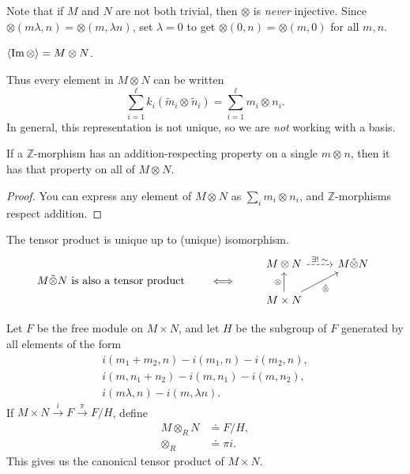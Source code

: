 \documentclass[twoside,10pt]{report}
\begin{document}
Note that if $M$ and $N$ are not both trivial, then $\otimes$ is \textit{never} injective. Since $\otimes(m \lambda,n) = \otimes(m,\lambda n)$, set $\lambda=0$ to get $\otimes(0,n)=\otimes(m,0)$ for all $m,n$.

\begin{prop}
$\langle \operatorname{Im} \otimes \rangle=M \otimes N$.
\end{prop}
Thus every element in $M \otimes_{}N$ can be written
\[
	\sum_{i=1}^{\ell} k_i (\tilde{m}_{i}\otimes_{}\tilde{n}_{i}) = \sum_{i=1}^{\ell} m_i \otimes_{}n_i.
\] 
In general, this representation is not unique, so we are \textit{not} working with a basis.

\begin{lem}
If a $\mathbb{Z}$-morphism has an addition-respecting property on a single $m \otimes_{}n$, then it has that property on all of $M \otimes_{}N$.
\end{lem}
\begin{proof}
	You can express any element of $M \otimes_{}N$ as $\sum_i m_i \otimes_{}n_i$, and $\mathbb{Z}$-morphisms respect addition.
\end{proof}

\begin{thrm}[Uniqueness]
	The tensor product is unique up to (unique) isomorphism.
	\begin{equation*}
        \begin{aligned}[c]
		M \tilde{\otimes} N \text{ is also a tensor product}
        \end{aligned}
        \qquad\iff\qquad
        \begin{aligned}[c]
		\begin{tikzcd}
			M \otimes N \rar[dashed]{\exists!\;\sim} & M \tilde{\otimes} N \\
			M\times N \uar{\otimes}\arrow[ur,"\tilde{\otimes}"']
		\end{tikzcd}
        \end{aligned}
	\end{equation*}
\end{thrm}

Let $F$ be the free module on $M \times N$, and let $H$ be the subgroup of $F$ generated by all elements of the form
\begin{align*}
	i(m_1+m_2,n) - i(m_1,n) - i(m_2,n),\\
	i(m,n_1+n_2) - i(m,n_1) - i(m,n_2),\\
	i(m\lambda,n) - i(m,\lambda n).
\end{align*}
If $M\times N \stackrel{i}{\to } F \stackrel{\pi}{\to } F/H$, define
\begin{align*}
	M \otimes_{R}N &\doteq F/H,\\
	\otimes_{R} &\doteq \pi i.
\end{align*}
This gives us the canonical tensor product of $M \times N$.
\end{document}
